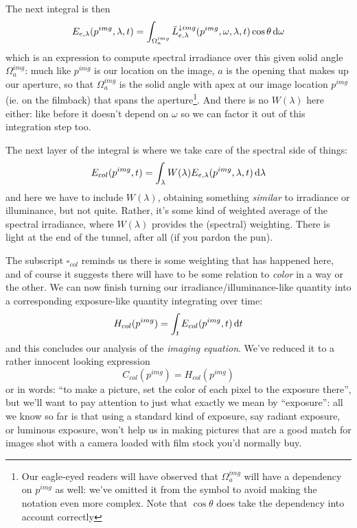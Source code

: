 The next integral is then 
\begin{displaymath}
	E_{e,\lambda}(p^{img},\lambda,t) = \int_{\Omega^{img}_a} \bar L^{\downarrow img}_{e,\lambda}(p^{img}, \omega, \lambda, t) \cos\theta \mathop{}\!\mathrm{d}\omega
\end{displaymath}
which is an expression to compute \gls{spectral} \gls{irradiance} over this given
solid angle $\Omega^{img}_a$: much like $p^{img}$ is our location on the image, 
$a$ is the opening that makes up our aperture, so that 
$\Omega^{img}_a$ is the solid angle with apex at our image location $p^{img}$ (ie. on the filmback) 
that spans the aperture\footnote{
	Our eagle-eyed readers will have observed that $\Omega^{img}_a$ will have a dependency 
	on $p^{img}$ as well: we've omitted it from the symbol to avoid making the notation even 
	more complex. Note that $\cos\theta$ does take the dependency into account correctly}.
And there is no $W(\lambda)$ here either: like before it doesn't depend on $\omega$ so 
we can factor it out of this integration step too.

The next layer of the integral is where we take care of the \gls{spectral} side of things:
\begin{displaymath}
	E_{col}(p^{img}, t) = \int_{\lambda} W(\lambda) E_{e,\lambda}(p^{img},\lambda,t) \mathop{}\!\mathrm{d}\lambda
\end{displaymath}
and here we have to include $W(\lambda)$, obtaining something \emph{similar} to \gls{irradiance} or
\gls{illuminance}, but not quite. Rather, it's some kind of weighted average of the spectral
irradiance, where $W(\lambda)$ provides the (spectral) weighting. 
There is light at the end of the tunnel, after all (if you pardon the pun). 

The subscript $\square_{col}$ reminds us there is some weighting that has happened here, 
and of course it suggests there will have to be some relation to \emph{color} in a way or the 
other.
We can now finish turning our \gls{irradiance}/\gls{illuminance}-like quantity into 
a corresponding \gls{exposure}-like quantity integrating over time:
\begin{displaymath}
	H_{col}(p^{img}) = \int_t E_{col}(p^{img},t) \mathop{}\!\mathrm{d} t
\end{displaymath}
and this concludes our analysis of the \textsl{imaging equation}. 
We've reduced it to a rather innocent looking expression
\begin{displaymath}
 	C_{col}(p^{img}) = H_{col}(p^{img})
\end{displaymath}
or in words: ``to make a picture, set the color of each pixel to the exposure there'', 
but we'll want to pay attention to just what exactly we mean by ``exposure'': 
all we know so far is that using a standard kind of exposure, say radiant exposure, or
luminous exposure, won't help us in making pictures that are a good match for images
shot with a camera loaded with film stock you'd normally buy.

